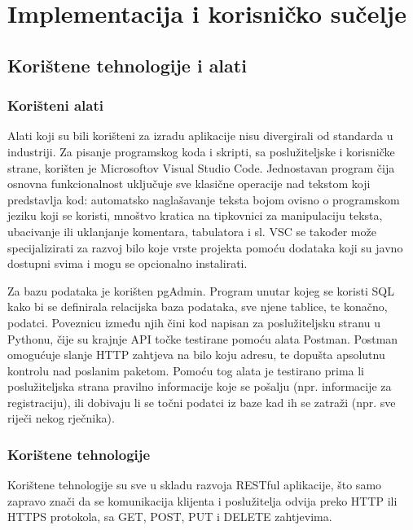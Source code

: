 \chapter{Implementacija i korisničko sučelje}
		
		
		\section{Korištene tehnologije i alati}

             \subsection{Korišteni alati}
                    Alati koji su bili korišteni za izradu aplikacije nisu divergirali od standarda u industriji. Za pisanje
                programskog koda i skripti, sa poslužiteljske i korisničke strane, korišten je Microsoftov Visual Studio Code. 
                Jednostavan program čija osnovna funkcionalnost uključuje sve klasične operacije nad tekstom koji predstavlja kod:
                automatsko naglašavanje teksta bojom ovisno o programskom jeziku koji se koristi, mnoštvo kratica 
                na tipkovnici za manipulaciju teksta, ubacivanje ili uklanjanje komentara, tabulatora i sl. VSC se također može 
                specijalizirati za razvoj bilo koje vrste projekta pomoću dodataka koji su javno dostupni svima i mogu se 
                opcionalno instalirati.

                Za bazu podataka je korišten pgAdmin. Program unutar kojeg se koristi SQL kako bi se definirala relacijska baza
                podataka, sve njene tablice, te konačno, podatci. Poveznicu između njih čini kod napisan za poslužiteljsku stranu 
                u Pythonu, čije su krajnje API točke testirane pomoću alata Postman. Postman omogućuje slanje HTTP zahtjeva na 
                bilo koju adresu, te dopušta apsolutnu kontrolu nad poslanim paketom. Pomoću tog alata je testirano prima
                li poslužiteljska strana pravilno informacije koje se pošalju (npr. informacije za registraciju), ili dobivaju li
                se točni podatci iz baze kad ih se zatraži (npr. sve riječi nekog rječnika).

            \subsection{Korištene tehnologije}
                    Korištene tehnologije su sve u skladu razvoja RESTful aplikacije, što samo zapravo znači da se komunikacija
                klijenta i poslužitelja odvija preko HTTP ili HTTPS protokola, sa GET, POST, PUT i DELETE zahtjevima. 
                
